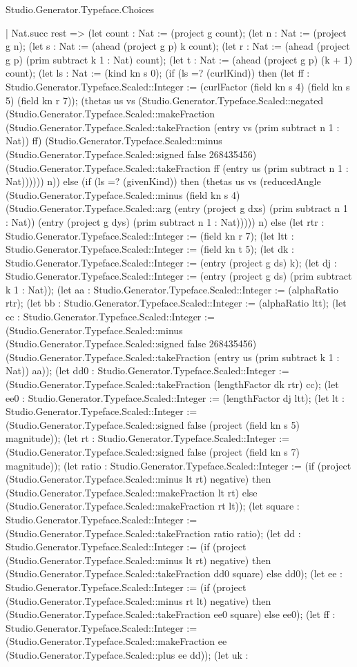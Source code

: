 \begin{lexlean}{Studio.Generator.Typeface.Choices}
\begin{semanticmodule}
{    | Nat.succ rest => (let count : Nat := (project g count); (let n : Nat := (project g n); (let s : Nat := (ahead (project g p) k count); (let r : Nat := (ahead (project g p) (prim subtract k 1 : Nat) count); (let t : Nat := (ahead (project g p) (k + 1) count); (let ls : Nat := (kind kn s 0); (if (ls =? (curlKind)) then (let ff : Studio.Generator.Typeface.Scaled::Integer := (curlFactor (field kn s 4) (field kn s 5) (field kn r 7)); (thetas us vs (Studio.Generator.Typeface.Scaled::negated (Studio.Generator.Typeface.Scaled::makeFraction (Studio.Generator.Typeface.Scaled::takeFraction (entry vs (prim subtract n 1 : Nat)) ff) (Studio.Generator.Typeface.Scaled::minus (Studio.Generator.Typeface.Scaled::signed false 268435456) (Studio.Generator.Typeface.Scaled::takeFraction ff (entry us (prim subtract n 1 : Nat)))))) n)) else (if (ls =? (givenKind)) then (thetas us vs (reducedAngle (Studio.Generator.Typeface.Scaled::minus (field kn s 4) (Studio.Generator.Typeface.Scaled::arg (entry (project g dxs) (prim subtract n 1 : Nat)) (entry (project g dys) (prim subtract n 1 : Nat))))) n) else (let rtr : Studio.Generator.Typeface.Scaled::Integer := (field kn r 7); (let ltt : Studio.Generator.Typeface.Scaled::Integer := (field kn t 5); (let dk : Studio.Generator.Typeface.Scaled::Integer := (entry (project g ds) k); (let dj : Studio.Generator.Typeface.Scaled::Integer := (entry (project g ds) (prim subtract k 1 : Nat)); (let aa : Studio.Generator.Typeface.Scaled::Integer := (alphaRatio rtr); (let bb : Studio.Generator.Typeface.Scaled::Integer := (alphaRatio ltt); (let cc : Studio.Generator.Typeface.Scaled::Integer := (Studio.Generator.Typeface.Scaled::minus (Studio.Generator.Typeface.Scaled::signed false 268435456) (Studio.Generator.Typeface.Scaled::takeFraction (entry us (prim subtract k 1 : Nat)) aa)); (let dd0 : Studio.Generator.Typeface.Scaled::Integer := (Studio.Generator.Typeface.Scaled::takeFraction (lengthFactor dk rtr) cc); (let ee0 : Studio.Generator.Typeface.Scaled::Integer := (lengthFactor dj ltt); (let lt : Studio.Generator.Typeface.Scaled::Integer := (Studio.Generator.Typeface.Scaled::signed false (project (field kn s 5) magnitude)); (let rt : Studio.Generator.Typeface.Scaled::Integer := (Studio.Generator.Typeface.Scaled::signed false (project (field kn s 7) magnitude)); (let ratio : Studio.Generator.Typeface.Scaled::Integer := (if (project (Studio.Generator.Typeface.Scaled::minus lt rt) negative) then (Studio.Generator.Typeface.Scaled::makeFraction lt rt) else (Studio.Generator.Typeface.Scaled::makeFraction rt lt)); (let square : Studio.Generator.Typeface.Scaled::Integer := (Studio.Generator.Typeface.Scaled::takeFraction ratio ratio); (let dd : Studio.Generator.Typeface.Scaled::Integer := (if (project (Studio.Generator.Typeface.Scaled::minus lt rt) negative) then (Studio.Generator.Typeface.Scaled::takeFraction dd0 square) else dd0); (let ee : Studio.Generator.Typeface.Scaled::Integer := (if (project (Studio.Generator.Typeface.Scaled::minus rt lt) negative) then (Studio.Generator.Typeface.Scaled::takeFraction ee0 square) else ee0); (let ff : Studio.Generator.Typeface.Scaled::Integer := (Studio.Generator.Typeface.Scaled::makeFraction ee (Studio.Generator.Typeface.Scaled::plus ee dd)); (let uk : }
\end{semanticmodule}
\end{lexlean}
